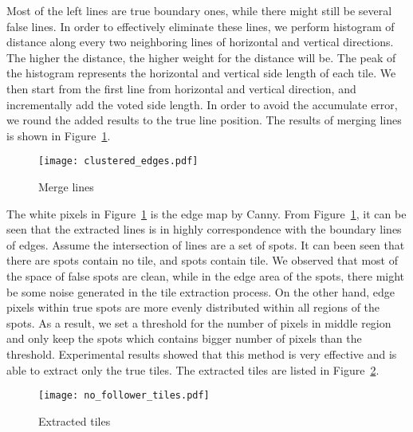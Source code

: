 \begin{enumerate}
Most of the left lines are true boundary ones, while there might still be
several false lines. In order to effectively eliminate these lines, we perform
histogram of distance along every two neighboring lines of horizontal and
vertical directions. The higher the distance, the higher weight for the distance
will be. The peak of the histogram represents the horizontal and vertical side
length of each tile. We then start from the first line from horizontal and
vertical direction, and incrementally add the voted side length. In order to
avoid the accumulate error, we round the added results to the true line
position. The results of merging lines is shown in Figure~\ref{Merge_line}.

\begin{figure}[htbp] \centering
\texttt{[image: clustered\_edges.pdf]}
\caption{Merge lines}
\label{Merge_line}
\end{figure} 
\end{enumerate} 

The white pixels in Figure~\ref{Merge_line} is the edge map by Canny. From
Figure~\ref{Merge_line}, it can be seen that the extracted lines is in highly
correspondence with the boundary lines of edges. Assume the intersection of lines
are a set of spots. It can been seen that there are spots contain no tile, and
spots contain tile. We observed that most of the space of false spots are clean,
while in the edge area of the spots, there might be some noise generated in the
tile extraction process. On the other hand, edge pixels within true spots are
more evenly distributed within all regions of the spots. As a result, we set a
threshold for the number of pixels in middle region and only keep the spots which
contains bigger number of pixels than the threshold. Experimental results showed
that this method is very effective and is able to extract only the true tiles.
The extracted tiles are listed in Figure~\ref{ex_tiles}.


\begin{figure}[htbp]
\centering
\texttt{[image: no\_follower\_tiles.pdf]} 
\caption{Extracted tiles}
\label{ex_tiles}
\end{figure}